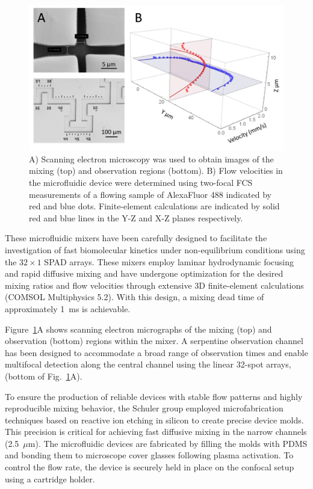 \begin{figure}
    \centering
    \includegraphics[width=\textwidth]{chapters/figures/schuler_mixer.jpg}
    \caption{\label{fig:schuler_mixer} 
    A) Scanning electron microscopy was used to obtain images of the mixing (top) and observation regions (bottom). 
    B) Flow velocities in the microfluidic device were determined using two-focal \ac{FCS} measurements of a flowing sample of AlexaFluor 488 indicated by red and blue dots.
    Finite-element calculations are indicated by solid red and blue lines in the Y-Z and X-Z planes respectively.
    }
\end{figure}

These microfluidic mixers have been carefully designed to facilitate the investigation of fast biomolecular kinetics under non-equilibrium conditions using the $32\times1$ \ac{SPAD} arrays. 
These mixers employ laminar hydrodynamic focusing and rapid diffusive mixing and have undergone optimization for the desired mixing ratios and flow velocities through extensive 3D finite-element calculations (COMSOL Multiphysics 5.2). 
With this design, a mixing dead time of approximately 1~ms is achievable. 

Figure~\ref{fig:schuler_mixer}A shows scanning electron micrographs of the mixing (top) and observation (bottom) regions within the mixer. 
A serpentine observation channel has been designed to accommodate a broad range of observation times and enable multifocal detection along the central channel using the linear 32-spot arrays, (bottom of Fig.~\ref{fig:schuler_mixer}A).

To ensure the production of reliable devices with stable flow patterns and highly reproducible mixing behavior, the Schuler group employed microfabrication techniques based on reactive ion etching in silicon to create precise device molds. 
This precision is critical for achieving fast diffusive mixing in the narrow channels (2.5~$\mu$m). 
The microfluidic devices are fabricated by filling the molds with \ac{PDMS} and bonding them to microscope cover glasses following plasma activation. 
To control the flow rate, the device is securely held in place on the confocal setup using a cartridge holder. 

